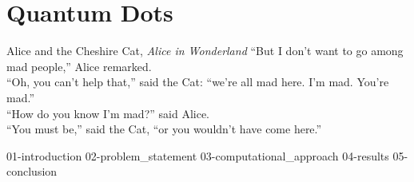 \chapter{\label{ch:quantum dots}Quantum Dots}

\begin{frontquote}{Alice and the Cheshire Cat, \emph{Alice in Wonderland}}
``But I don’t want to go among mad people,'' Alice remarked. \\
``Oh, you can't help that,'' said the Cat: ``we're all mad here. I'm mad. You're mad.'' \\
``How do you know I'm mad?'' said Alice. \\
``You must be,'' said the Cat, ``or you wouldn't have come here.''\\
\end{frontquote}

{01-introduction}
{02-problem_statement}
{03-computational_approach}
{04-results}
{05-conclusion}
